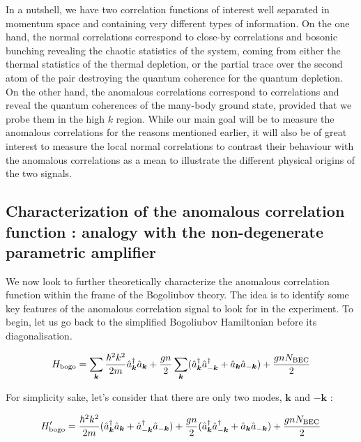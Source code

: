 In a nutshell, we have two correlation functions of interest well separated in momentum space and containing very different types of information. On the one hand, the normal correlations correspond to close-by correlations and bosonic bunching revealing the chaotic statistics of the system, coming from either the thermal statistics of the thermal depletion, or the partial trace over the second atom of the pair destroying the quantum coherence for the quantum depletion. On the other hand, the anomalous correlations correspond to \kmk correlations and reveal the quantum coherences of the many-body ground state, provided that we probe them in the high $k$ region. While our main goal will be to measure the anomalous \kmk correlations for the reasons mentioned earlier, it will also be of great interest to measure the local normal correlations to contrast their behaviour with the anomalous correlations as a mean to illustrate the different physical origins of the two signals. 


\subsection{Characterization of the anomalous correlation function : analogy with the non-degenerate parametric amplifier}

\label{sec:amp_parametric}

We now look to further theoretically characterize the anomalous correlation function within the frame of the Bogoliubov theory. The idea is to identify some key features of the anomalous correlation signal to look for in the experiment. To begin, let us go back to the simplified Bogoliubov Hamiltonian before its diagonalisation.

\begin{equation}
    H_{\rm{bogo}}=\sum_{\bm{k}}\frac{\hbar^2 k^2}{2m} \hat{a}^{\dagger}_{\bm{k}}  \hat{a}_{\bm{k}} +  \frac{gn}{2} \sum_{\bm{k}} (\hat{a}^{\dagger}_{\bm{k}} \hat{a}^{\dagger}_{-\bm{k}} +\hat{a}_{\bm{k}} \hat{a}_{-\bm{k}})+\frac{gnN_{\rm{BEC}}}{2}
\end{equation}


\noindent For simplicity sake, let's consider that there are only two modes, $\bm{k}$ and $-\bm{k}$  : 

\begin{equation}
        H_{\rm{bogo}}'=\frac{\hbar^2 k^2}{2m} (\hat{a}^{\dagger}_{\bm{k}}  \hat{a}_{\bm{k}} + \hat{a}^{\dagger}_{-\bm{k}}  \hat{a}_{-\bm{k}}) +  \frac{gn}{2}  (\hat{a}^{\dagger}_{\bm{k}} \hat{a}^{\dagger}_{-\bm{k}} +\hat{a}_{\bm{k}} \hat{a}_{-\bm{k}})+\frac{gnN_{\rm{BEC}}}{2}
\end{equation}

